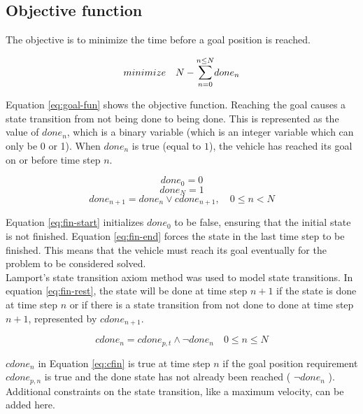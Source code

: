 \subsection{Objective function}
The objective is to minimize the time before a goal position is reached.

\begin{equation}
\label{eq:goal-fun}
minimize \quad N - \mathlarger{\sum}_{n=0}^{n \leq N} done_n
\end{equation}

Equation \ref{eq:goal-fun} shows the objective function. Reaching the goal causes a state transition from not being done to being done. This is represented as the value of $done_n$, which is a binary variable (which is an integer variable which can only be 0 or 1). When $done_n$ is true (equal to $1$), the vehicle has reached its goal on or before time step $n$.

\begin{equation}
\label{eq:fin-start}
done_0 = 0
\end{equation}
\begin{equation}
\label{eq:fin-end}
done_{N} = 1
\end{equation}
\begin{equation}
\label{eq:fin-rest}
done_{n+1} = done_n \vee cdone_{n+1},  \quad 0 \leq n < N
\end{equation}

Equation \ref{eq:fin-start} initializes $done_0$ to be false, ensuring that the initial state is not finished. Equation \ref{eq:fin-end} forces the state in the last time step to be finished. This means that the vehicle must reach its goal eventually for the problem to be considered solved. \\
Lamport's \cite{Lamport1989} state transition axiom method was used to model state transitions. In equation \ref{eq:fin-rest}, the state will be done at time step $n+1$ if the state is done at time step $n$ or if there is a state transition from not done to done at time step $n + 1$, represented by $cdone_{n+1}$.

\begin{equation}
\label{eq:cfin}
cdone_n =  cdone_{p,t} \wedge \neg done_n\quad 0 \leq n \leq N
\end{equation}

 $cdone_n$ in Equation \ref{eq:cfin} is true at time step $n$ if the goal position requirement $cdone_{p,n}$ is true and the done state has not already been reached ( $ \neg done_n$ ). Additional constraints on the state transition, like a maximum velocity, can be added here.

